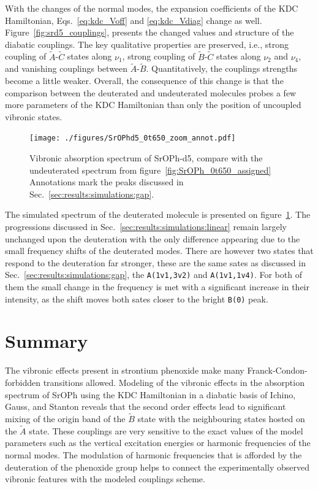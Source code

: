 \documentclass{article}
\begin{document}
With the changes of the normal modes, the expansion coefficients of the KDC
Hamiltonian, Eqs.~\eqref{eq:kdc_Voff} and \eqref{eq:kdc_Vdiag} change as well.
Figure~\ref{fig:srd5_couplings}, presents the changed values and structure of
the diabatic couplings. The key qualitative properties are preserved, i.e.,
strong coupling of $\tilde{A}$-$\tilde{C}$ states along $\nu _1$, strong
coupling of $\tilde{B}$-$\tilde{C}$ states along $\nu _2$ and $\nu _4$, and
vanishing couplings between $\tilde{A}$-$\tilde{B}$. Quantitatively, the
couplings strengths become a little weaker. Overall, the consequence of this
change is that the comparison between the deuterated and undeuterated molecules
probes a few more parameters of the KDC Hamiltonian than only the position of
uncoupled vibronic states.

\begin{figure}
    \begin{center}
        \texttt{[image: ./figures/SrOPhd5\_0t650\_zoom\_annot.pdf]}
    \end{center}
    \caption{
        Vibronic absorption spectrum of SrOPh-d5, compare with the undeuterated
        spectrum from figure~\ref{fig:SrOPh_0t650_assigned} Annotations mark
        the peaks discussed in Sec.~\ref{sec:results:simulations:gap}.
    }
    \label{fig:Srd5_spectrum}
\end{figure}

The simulated spectrum of the deuterated molecule is presented on
figure~\ref{fig:Srd5_spectrum}. The progressions discussed in
Sec.~\ref{sec:results:simulations:linear} remain largely unchanged upon the
deuteration with the only difference appearing due to the small frequency
shifts of the deuterated modes. There are however two states that respond to
the deuteration far stronger, these are the same sates as discussed in
Sec.~\ref{sec:results:simulations:gap}, the \texttt{A(1v1,3v2)} and
\texttt{A(1v1,1v4)}. For both of them the small change in the frequency is met
with a significant increase in their intensity, as the shift moves both sates
closer to the bright \texttt{B(0)} peak.

\section{Summary}

The vibronic effects present in strontium phenoxide make many
Franck-Condon-forbidden transitions allowed. Modeling of the vibronic effects
in the absorption spectrum of SrOPh using the KDC Hamiltonian in a diabatic
basis of Ichino, Gauss, and Stanton reveals that the second order effects lead
to significant mixing of the origin band of the $\tilde{B}$ state with the
neighbouring states hosted on the $\tilde{A}$ state. These couplings are very
sensitive to the exact values of the model parameters such as the vertical
excitation energies or harmonic frequencies of the normal modes. The modulation
of harmonic frequencies that is afforded by the deuteration of the phenoxide
group helps to connect the experimentally observed vibronic features with the
modeled couplings scheme.

\newpage
\printbibliography{}
\end{document}

